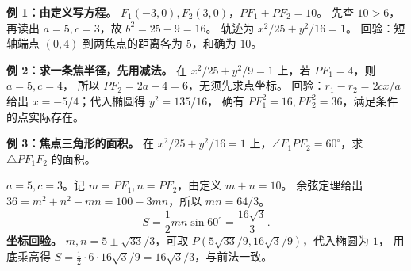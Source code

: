 \begin{examplebox}
\textbf{例 1：由定义写方程。} $F_1(-3,0),F_2(3,0)$，$PF_1+PF_2=10$。
先查 $10>6$，再读出 $a=5,c=3$，故 $b^2=25-9=16$。
轨迹为 $\boxed{x^2/25+y^2/16=1}$。
回验：短轴端点 $(0,4)$ 到两焦点的距离各为 $5$，和确为 $10$。

\medskip
\textbf{例 2：求一条焦半径，先用减法。}
在 $x^2/25+y^2/9=1$ 上，若 $PF_1=4$，则 $a=5,c=4$，
所以 $PF_2=2a-4=\boxed{6}$，无须先求点坐标。
回验：$r_1-r_2=2cx/a$ 给出 $x=-5/4$；代入椭圆得 $y^2=135/16$，
确有 $PF_1^2=16,PF_2^2=36$，满足条件的点实际存在。
\end{examplebox}
\clearpage
\begin{examplebox}
\textbf{例 3：焦点三角形的面积。}
在 $x^2/25+y^2/16=1$ 上，$\angle F_1PF_2=60^\circ$，求 $\triangle PF_1F_2$ 的面积。

$a=5,c=3$。记 $m=PF_1,n=PF_2$，由定义 $m+n=10$。
余弦定理给出 $36=m^2+n^2-mn=100-3mn$，所以 $mn=64/3$。
\[
S=\frac12mn\sin60^\circ=\boxed{\frac{16\sqrt3}{3}}.
\]
\textbf{坐标回验。} $m,n=5\pm\sqrt{33}/3$，可取
$P(5\sqrt{33}/9,16\sqrt3/9)$，代入椭圆为 $1$，
用底乘高得 $S=\tfrac12\cdot6\cdot16\sqrt3/9=16\sqrt3/3$，与前法一致。
\end{examplebox}
\clearpage
